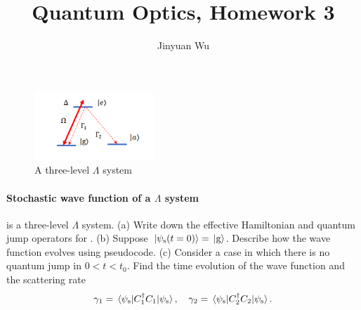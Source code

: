 \documentclass[hyperref, a4paper]{article}
\title{Quantum Optics, Homework 3}
\author{Jinyuan Wu}
\begin{document}
\maketitle

\begin{figure}
    \centering
    \includegraphics[width=0.4\textwidth]{fig1.png}
    \caption{A three-level $\Lambda$ system}
    \label{fig:sys-1}
\end{figure}

\paragraph{Stochastic wave function of a $\Lambda$ system}  is a three-level $\Lambda$ system.
(a) Write down the effective Hamiltonian and quantum jump operators for .
(b) Suppose $\ket*{\psi_\text{s}(t=0)} = \ket*{\text{g}}$. Describe how the wave function evolves using pseudocode.
(c) Consider a case in which there is no quantum jump in $0 < t < t_0$. Find the time evolution of the 
wave function and the scattering rate 
\begin{equation}
    \gamma_1 = \expval*{C_1^\dagger C_1}{\psi_\text{s}}, \quad \gamma_2 = \expval*{C_2^\dagger C_2}{\psi_\text{s}}.
\end{equation}
\end{document}
